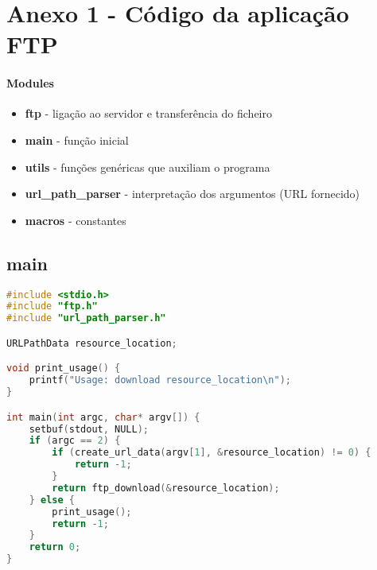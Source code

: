 \section{Anexo 1 - Código da aplicação FTP}

\paragraph{Modules}

\begin{itemize}
    \item \textbf{ftp} - ligação ao servidor e transferência do ficheiro
    \item \textbf{main} - função inicial
    \item \textbf{utils} - funções genéricas que auxiliam o programa
    \item \textbf{url\_path\_parser} - interpretação dos argumentos (URL fornecido)
    \item \textbf{macros} - constantes
\end{itemize}

\subsection{main}

\begin{lstlisting}[language=C, caption=main.c]
#include <stdio.h>
#include "ftp.h"
#include "url_path_parser.h"

URLPathData resource_location;

void print_usage() {
    printf("Usage: download resource_location\n");
}

int main(int argc, char* argv[]) {
    setbuf(stdout, NULL);
    if (argc == 2) {
        if (create_url_data(argv[1], &resource_location) != 0) {
            return -1;
        }
        return ftp_download(&resource_location);
    } else {    
        print_usage();
        return -1;
    }
    return 0;
}
\end{lstlisting}



